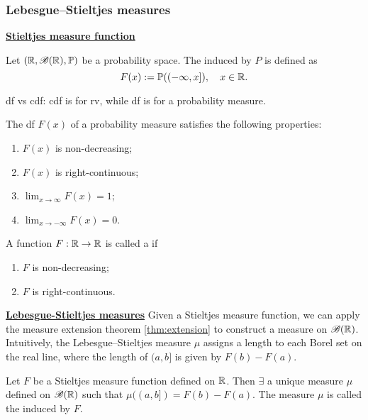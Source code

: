 \documentclass[10pt,a4paper]{article}
\begin{document}
\subsubsection{Lebesgue--Stieltjes measures}\label{sec:LS-measure}
\underline{\textbf{Stieltjes measure function}}
\begin{defbox}
	\begin{definition}\label{def:dist}
		Let $(\mathbb R,\mathscr{B}(\mathbb R),\mathbb P)$ be a probability space. The  induced by $P$ is defined as 
		\begin{equation*}
			F(x):=\mathbb P((-\infty ,x]),\quad x\in\mathbb R.
		\end{equation*}  
	\end{definition}
\end{defbox}
df vs cdf: cdf is for rv, while df is for a probability measure.
\begin{thmbox}
	\begin{theorem}[Properties of df]\label{thm:df-prop}\rm
		The df $F(x)$ of a probability measure satisfies the following properties:
		\begin{enumerate}
			\item $F(x)$ is non-decreasing;
			\item $F(x)$ is right-continuous;
			\item $\lim_{x\to \infty }F(x)=1$;
			\item $\lim_{x\to -\infty}F(x)=0$.  
		\end{enumerate} 
	\end{theorem}
\end{thmbox}

\begin{defbox}
	\begin{definition}\label{def:Stieltjes-measure}
		A function $F:\mathbb R\to\mathbb R$ is called a  if 
		\begin{enumerate}
			\item $F$ is non-decreasing;
			\item $F$ is right-continuous.  
		\end{enumerate} 
	\end{definition}
\end{defbox}

\noindent\underline{\textbf{Lebesgue-Stieltjes measures}}
Given a Stieltjes measure function, we can apply the measure extension theorem \ref{thm:extension} to construct a measure on $\mathscr{B}(\mathbb R)$. Intuitively, the Lebesgue--Stieltjes measure $\mu$ assigns a length to each Borel set on the real line, where the length of $(a,b]$ is given by $F(b)-F(a)$.
\begin{thmbox}
	\begin{theorem}\label{thm:LSmeasure}\rm
		Let $F$ be a Stieltjes measure function defined on $\mathbb R$. Then $\exists$ a unique measure $\mu$ defined on $\mathscr{B}(\mathbb R)$ such that $\mu((a,b])=F(b)-F(a)$. The measure $
		\mu$ is called the  induced by $F$.        
	\end{theorem}
\end{thmbox}
\end{document}

